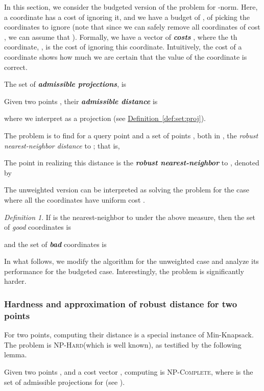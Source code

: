 \documentclass[12pt]{article}\usepackage[cm]{fullpage}
\newcommand{\emphic}[2]{\textcolor{blue25}{\textbf{\emph{#1}}}\index{#2}}
\renewcommand{\emphic}[2]{\textbf{\emph{#1}}}
\newcommand{\emphi}[1]{\emphic{#1}{#1}}
\theoremstyle{remark}\theoremheaderfont{\sf}\theorembodyfont{\upshape}\newtheorem{defn}[theorem]{Definition}
\numberwithin{figure}{section}\numberwithin{table}{section}\numberwithin{equation}{section}
\newcommand{\HLink}[2]{\hyperref[#2]{#1~\ref*{#2}}}
\providecommand{\deflab}[1]{\label{def:#1}}
\newcommand{\defref}[1]{\HLink{Definition}{def:#1}}
\newcommand{\lemlab}[1]{\label{lemma:#1}}
\renewcommand{\th}{th\xspace}
\providecommand{\ProblemC}[1]{\textsf{#1}}
\providecommand{\ComplexityClass}[1]{{{{\textsc{#1}}}}}
\providecommand{\NPHard}{\ComplexityClass{NP-Hard}\xspace}
\providecommand{\NPComplete}{\ComplexityClass{NP-Complete}\xspace}
\begin{document}
In this section, we consider the budgeted version of the problem for
-norm. Here, a coordinate  has a cost  of
ignoring it, and we have a budget of , of picking the coordinates
to ignore (note that since we can safely remove all coordinates of
cost , we can assume that ).  Formally, we have a
vector of \emphi{costs} , where
the \th coordinate, , is the cost of ignoring this
coordinate.  Intuitively, the cost of a coordinate shows how much we
are certain that the value of the coordinate is correct.

The set of \emphi{admissible projections}, is

Given two points , their \emphi{admissible distance} is

where we interpret  as a projection (see \defref{set:proj}).


The problem is to find for a query point  and a set of points
, both in , the \emph{robust nearest-neighbor
   distance} to ; that is,

The point in  realizing this distance is the \emphi{robust
   nearest-neighbor} to , denoted by

The unweighted version can be interpreted as solving the problem for
the case where all the coordinates have uniform cost .


\begin{defn}
    \deflab{good:bad}If  is the nearest-neighbor to  under the above
    measure, then the set of \emph{good} coordinates is
    
    and the set of \emphi{bad} coordinates is
    
\end{defn}



In what follows, we modify the algorithm for the unweighted case and
analyze its performance for the budgeted case. Interestingly, the
problem is significantly harder.

\subsubsection{Hardness and approximation of robust distance for two points}

For two points, computing their distance is a special instance of
\ProblemC{Min-Knapsack}. The problem is \NPHard (which is well known),
as testified by the following lemma.

\begin{lemma}
    \lemlab{2:points}Given two points , and a cost vector
    , computing
     is
    \NPComplete, where  is the set of admissible projections
    for  (see ).
\end{lemma}
\end{document}
